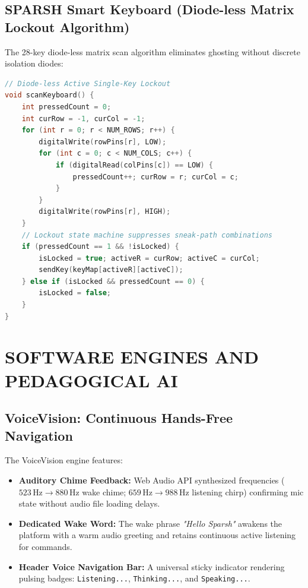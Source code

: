 \documentclass[12pt,a4paper]{report}
\begin{document}
\section{SPARSH Smart Keyboard (Diode-less Matrix Lockout Algorithm)}
The 28-key diode-less matrix scan algorithm eliminates ghosting without discrete isolation diodes:
\begin{lstlisting}[language=C++]
// Diode-less Active Single-Key Lockout
void scanKeyboard() {
    int pressedCount = 0;
    int curRow = -1, curCol = -1;
    for (int r = 0; r < NUM_ROWS; r++) {
        digitalWrite(rowPins[r], LOW);
        for (int c = 0; c < NUM_COLS; c++) {
            if (digitalRead(colPins[c]) == LOW) {
                pressedCount++; curRow = r; curCol = c;
            }
        }
        digitalWrite(rowPins[r], HIGH);
    }
    // Lockout state machine suppresses sneak-path combinations
    if (pressedCount == 1 && !isLocked) {
        isLocked = true; activeR = curRow; activeC = curCol;
        sendKey(keyMap[activeR][activeC]);
    } else if (isLocked && pressedCount == 0) {
        isLocked = false;
    }
}
\end{lstlisting}

\chapter{SOFTWARE ENGINES AND PEDAGOGICAL AI}

\section{VoiceVision: Continuous Hands-Free Navigation}
The VoiceVision engine features:
\begin{itemize}
    \item \textbf{Auditory Chime Feedback:} Web Audio API synthesized frequencies ($523\,\text{Hz} \rightarrow 880\,\text{Hz}$ wake chime; $659\,\text{Hz} \rightarrow 988\,\text{Hz}$ listening chirp) confirming mic state without audio file loading delays.
    \item \textbf{Dedicated Wake Word:} The wake phrase \textit{"Hello Sparsh"} awakens the platform with a warm audio greeting and retains continuous active listening for commands.
    \item \textbf{Header Voice Navigation Bar:} A universal sticky indicator rendering pulsing badges: \texttt{Listening...}, \texttt{Thinking...}, and \texttt{Speaking...}.
\end{itemize}
\end{document}
